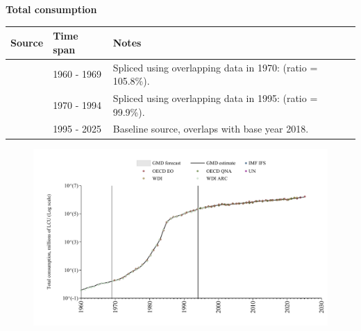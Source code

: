 \documentclass[12pt,a4paper,landscape]{article}
\begin{document}
\begin{adjustbox}{max totalsize={\paperwidth}{\paperheight},center}
\begin{minipage}[t][\textheight][t]{\textwidth}
\vspace*{0.5cm}
{}
\begin{center}
{\Large\bfseries Total consumption}
\end{center}
\vspace{0.5cm}
\begin{table}[H]
\centering
\small
\begin{tabular}{|l|l|l|}
\hline
\textbf{Source} & \textbf{Time span} & \textbf{Notes} \\
\hline
\rowcolor{white}\cite{WDI_ARC}& 1960 - 1969 &Spliced using overlapping data in 1970: (ratio = 105.8\%). \\
\rowcolor{lightgray}\cite{WDI}& 1970 - 1994 &Spliced using overlapping data in 1995: (ratio = 99.9\%). \\
\rowcolor{white}\cite{OECD_EO}& 1995 - 2025 &Baseline source, overlaps with base year 2018. \\
\hline
\end{tabular}
\end{table}
\begin{figure}[H]
\centering
\includegraphics[width=\textwidth,height=0.6\textheight,keepaspectratio]{graphs/ISR_cons.pdf}
\end{figure}
\end{minipage}
\end{adjustbox}
\end{document}
